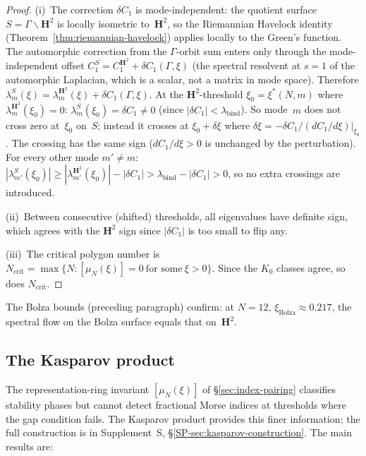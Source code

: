 \begin{proof}
(i)~The correction $\delta C_1$ is mode-independent:
the quotient surface $S = \Gamma\backslash\mathbf{H}^2$ is
locally isometric to~$\mathbf{H}^2$, so the Riemannian
Havelock identity (Theorem~\ref{thm:riemannian-havelock})
applies locally to the Green's function.
The automorphic correction from the $\Gamma$-orbit sum
enters only through the mode-independent offset
$C_1^S = C_1^{\mathbf{H}^2} + \delta C_1(\Gamma, \xi)$
(the spectral resolvent at $s = 1$ of the automorphic
Laplacian, which is a scalar, not a matrix in mode space).
Therefore $\lambda_m^S(\xi)
= \lambda_m^{\mathbf{H}^2}(\xi) + \delta C_1(\Gamma, \xi)$.
At the $\mathbf{H}^2$-threshold $\xi_0 = \xi^*(N,m)$
where $\lambda_m^{\mathbf{H}^2}(\xi_0) = 0$:
$\lambda_m^S(\xi_0) = \delta C_1 \ne 0$ (since $|\delta C_1|
< \lambda_{\mathrm{bind}}$).
So mode~$m$ does not cross zero at~$\xi_0$ on~$S$;
instead it crosses at $\xi_0 + \delta\xi$ where
$\delta\xi = -\delta C_1 / (dC_1/d\xi)|_{\xi_0}$.
The crossing has the same sign
($dC_1/d\xi > 0$ is unchanged by the perturbation).
For every other mode $m' \ne m$:
$|\lambda_{m'}^S(\xi_0)|
\ge |\lambda_{m'}^{\mathbf{H}^2}(\xi_0)| - |\delta C_1|
> \lambda_{\mathrm{bind}} - |\delta C_1| > 0$,
so no extra crossings are introduced.

(ii)~Between consecutive (shifted) thresholds, all eigenvalues
have definite sign, which agrees with the $\mathbf{H}^2$ sign
since $|\delta C_1|$ is too small to flip any.

(iii)~The critical polygon number is $N_{\mathrm{crit}} =
\max\{N : [\mu_N(\xi)] = 0\ \text{for some}\ \xi > 0\}$.
Since the $K_0$ classes agree, so does $N_{\mathrm{crit}}$.
\end{proof}

The Bolza bounds (preceding paragraph) confirm: at $N = 12$,
$\xi_{\mathrm{Bolza}} \approx 0.217$, the spectral flow
on the Bolza surface equals that on~$\mathbf{H}^2$.

\subsection{The Kasparov product}
\label{sec:kk-program}

The representation-ring invariant $[\mu_N(\xi)]$ of
\S\ref{sec:index-pairing} classifies stability phases but cannot
detect fractional Morse indices at thresholds where the gap
condition fails.
The Kasparov product provides this finer information;
the full construction is in
Supplement~S, \S\ref*{SP-sec:kasparov-construction}.
The main results are:

